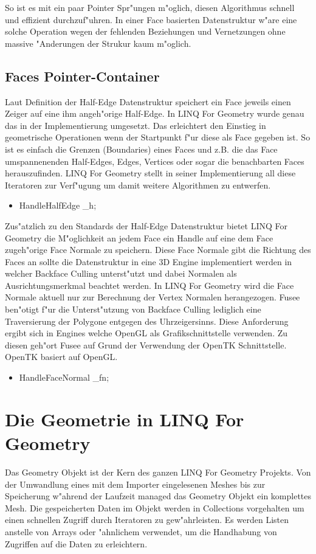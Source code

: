 \documentclass[pagesize, paper=a4, fontsize=12pt,titlepage=true, headings=small, headnosepline, abstractoff, liststotoc, nochapterprefix, plainheadsepline]{scrreprt}
\newcommand{\LFG}{LINQ For Geometry}
\newcommand{\LFGS}{LINQ For Geometry }
\newcommand{\HES}{Half-Edge Datenstruktur }
\begin{document}
So ist es mit ein paar Pointer Spr"ungen m"oglich, diesen Algorithmus schnell und effizient durchzuf"uhren. In einer Face basierten Datenstruktur w"are eine solche Operation wegen der fehlenden Beziehungen und Vernetzungen ohne massive "Anderungen der Strukur kaum m"oglich.
		\subsection {Faces Pointer-Container}
			Laut Definition der \HES speichert ein Face jeweils einen Zeiger auf eine ihm angeh"orige Half-Edge. In \LFGS wurde genau das in der Implementierung umgesetzt. Das erleichtert den Einstieg in geometrische Operationen wenn der Startpunkt f"ur diese als Face gegeben ist. So ist es einfach die Grenzen (Boundaries) eines Faces und z.B. die das Face umspannenenden Half-Edges, Edges, Vertices oder sogar die benachbarten Faces herauszufinden. \LFGS stellt in seiner Implementierung all diese Iteratoren zur Verf"ugung um damit weitere Algorithmen zu entwerfen.

\begin{itemize}
\item HandleHalfEdge \_h;
\end{itemize}

Zus"atzlich zu den Standards der \HES bietet \LFGS die M"oglichkeit an jedem Face ein Handle auf eine dem Face zugeh"orige Face Normale zu speichern. Diese Face Normale gibt die Richtung des Faces an sollte die Datenstruktur in eine 3D Engine implementiert werden in welcher Backface Culling unterst"utzt und dabei Normalen als Ausrichtungsmerkmal beachtet werden. In \LFGS wird die Face Normale aktuell nur zur Berechnung der Vertex Normalen herangezogen. Fusee ben"otigt f"ur die Unterst"utzung von Backface Culling lediglich eine Traversierung der Polygone entgegen des Uhrzeigersinns. Diese Anforderung ergibt sich in Engines welche OpenGL als Grafikschnittstelle verwenden. Zu diesen geh"ort Fusee auf Grund der Verwendung der OpenTK Schnittstelle. OpenTK basiert auf OpenGL.
\begin{itemize}
\item HandleFaceNormal \_fn;
\end{itemize}
\newpage
	\section {Die Geometrie in \LFG}
			Das Geometry Objekt ist der Kern des ganzen \LFGS Projekts. Von der Umwandlung eines mit dem Importer eingelesenen Meshes bis zur Speicherung w"ahrend der Laufzeit managed das Geometry Objekt ein komplettes Mesh. Die gespeicherten Daten im Objekt werden in Collections vorgehalten um einen schnellen Zugriff durch Iteratoren zu gew"ahrleisten. Es werden Listen anstelle von Arrays oder "ahnlichem verwendet, um die Handhabung von Zugriffen auf die Daten zu erleichtern.
\end{document}

